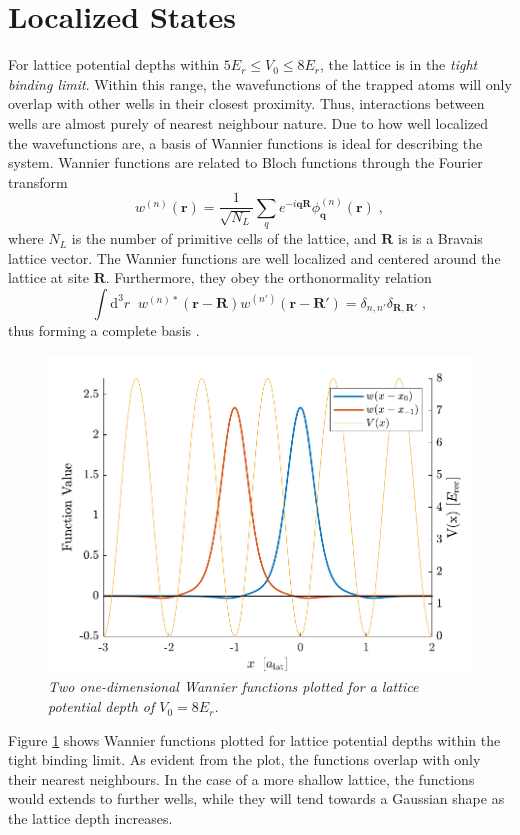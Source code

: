 \section{Localized States}
For lattice potential depths within $5 E_r \leq V_0 \leq 8 E_r$, the lattice is in the \textit{tight binding limit}. Within this range, the wavefunctions of the trapped atoms will only overlap with other wells in their closest proximity. Thus, interactions between wells are almost purely of nearest neighbour nature. Due to how well localized the wavefunctions are, a basis of Wannier functions is ideal for describing the system. Wannier functions are related to Bloch functions through the Fourier transform
\begin{equation}
	w^{(n)}(\boldsymbol{r}) = \frac{1}{\sqrt{N_L}} \sum_{q} e^{ -i \boldsymbol{q} \boldsymbol{R} } \phi_{\boldsymbol{q}}^{(n)}(\boldsymbol{r}) \; ,
\end{equation} 
where $N_L$ is the number of primitive cells of the lattice, and $\boldsymbol{R}$ is is a Bravais lattice vector. The Wannier functions are well localized and centered around the lattice at site $\boldsymbol{R}$. Furthermore, they obey the orthonormality relation
\begin{equation}
	\int \mathrm{d^3}r \; \; w^{(n) *}(\boldsymbol{r} - \boldsymbol{R}) w^{(n')}(\boldsymbol{r} - \boldsymbol{R'}) = \delta_{n,n'} \delta_{\boldsymbol{R},\boldsymbol{R}'} \; ,
\end{equation}
thus forming a complete basis \cite{manybodyBloch}.
\begin{figure}[!h]
	\centering
	\includegraphics[width=0.8\columnwidth]{Figures/WannierPlot3.pdf} 
	\caption{\textit{Two one-dimensional Wannier functions plotted for a lattice potential depth of $V_0 = 8 E_r$.}}
	\label{fig:WannierPlot} 
\end{figure}
Figure \ref{fig:WannierPlot} shows Wannier functions plotted for lattice potential depths within the tight binding limit. As evident from the plot, the functions overlap with only their nearest neighbours. In the case of a more shallow lattice, the functions would extends to further wells, while they will tend towards a Gaussian shape as the lattice depth increases.